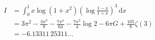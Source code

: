 %

\begin{problem}[pytanie 1046519]
    \label{stack_1046519}%
    \begin{align}
        I & = \int_0^1 x \log \left(1+x^2\right) \left(\log \frac{1-x}{1+x} \right)^3 \,\mathrm{d}x \\
        & = 3\pi^2-\frac{3\pi^3}{8}-\frac{7\pi^4}{64} - \frac{7\pi^2}{4} \log 2 - 6\pi{G} + \frac{105}{8}\zeta(3) \\
        & = -6.13311\, 25311\ldots
    \end{align}
\end{problem}

%
